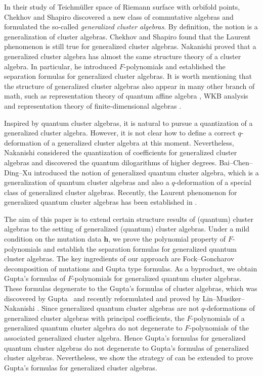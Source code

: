 \documentclass[pdftex]{sigma}
\numberwithin{equation}{section}
\begin{document}
In their study of Teichm\"{u}ller space of Riemann surface with orbifold points, Chekhov and Shapiro \cite{Chekhov_Shapiro} discovered a new class of commutative algebras and formulated the so-called {\it generalized cluster algebras}. By definition, the notion is a generalization of cluster algebras. Chekhov and Shapiro \cite{Chekhov_Shapiro} found that the Laurent phenomenon is still true for generalized cluster algebras. Nakanishi \cite{Nakanishi14} proved that a generalized cluster algebra has almost the same structure theory of a cluster algebra. In particular, he introduced $F$-polynomials and established the separation formulas for generalized cluster algebras. It is worth mentioning that the structure of generalized cluster algebras also appear in many other branch of math, such as representation theory of quantum affine algebra \cite{Gleitz2015}, WKB analysis \cite{Iwaki-Nakanishi2016} and representation theory of finite-dimensional algebras \cite{LFM18,LF-Velasco2018}.

Inspired by quantum cluster algebras, it is natural to pursue a quantization of a generalized cluster algebra. However, it is not clear how to define a correct $q$-deformation of a generalized cluster algebra at this moment. Nevertheless, Nakanishi \cite{Nakanishi-qgca} considered the quantization of coefficients for generalized cluster algebras and discovered the quantum dilogarithms of higher degrees. Bai--Chen--Ding--Xu \cite{BCDX2018} introduced the notion of generalized quantum cluster algebra, which is a generalization of quantum cluster algebras and also a $q$-deformation of a %
special class of generalized cluster algebras. Recently, the Laurent phenomenon for generalized quantum cluster algebras has been established in \cite{BCDX2023}.

The aim of this paper is to extend certain structure results of (quantum) cluster algebras to the setting of generalized (quantum) cluster algebras.
Under a mild condition on the mutation data $\mathbf{h}$, we prove the polynomial property %
of $F$-polynomials and establish the separation formulas for generalized quantum cluster algebras. The key ingredients of our approach are Fock--Goncharov decomposition of mutations and
Gupta type formulas.
As a byproduct, we obtain Gupta's formulas of $F$-polynomials for generalized quantum cluster algebras. These formulas degenerate to the Gupta's formulas of cluster algebras, which was discovered by Gupta~\cite{gupta2019} and recently reformulated and proved by Lin--Musiker--Nakanishi \cite{LMN2023}.
Since generalized quantum cluster algebras are not $q$-deformations of generalized cluster algebras with principal coefficients, the $F$-polynomials of a generalized quantum cluster algebra do not degenerate to $F$-polynomials of the associated generalized cluster algebra. Hence Gupta's formulas for generalized quantum cluster algebras do not degenerate to Gupta's formulas of generalized cluster algebras. Nevertheless, we show the strategy of \cite{LMN2023} can be extended to prove Gupta's formulas for generalized cluster algebras.
\end{document}
